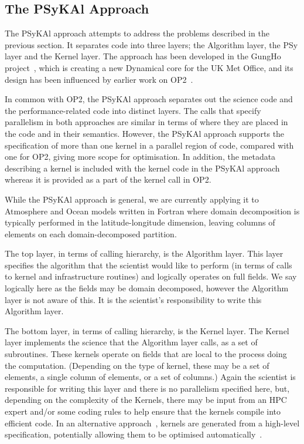 \documentclass[gmdd, manuscript]{copernicus}
\begin{document}
\subsection{The {PS}y{KA}l Approach}

The {PS}y{KA}l approach attempts to address the problems described in
the previous section. It separates code into three layers; the
Algorithm layer, the PSy layer and the Kernel layer. The approach has
been developed in the GungHo project~\citep{GungHo}, which is creating
a new Dynamical core for the UK Met Office, and its design has been
influenced by earlier work on OP2~\citep{OP2, PYOP2}.

In common with OP2, the {PS}y{KA}l approach separates out the science
code and the performance-related code into distinct layers. The calls
that specify parallelism in both approaches are similar in terms of
where they are placed in the code and in their semantics. However, the
{PS}y{KA}l approach supports the specification of more than one kernel
in a parallel region of code, compared with one for OP2, giving more
scope for optimisation. In addition, the metadata describing a kernel
is included with the kernel code in the {PS}y{KA}l approach whereas it
is provided as a part of the kernel call in OP2.

While the {PS}y{KA}l approach is general, we are currently applying it to
Atmosphere and Ocean models written in Fortran where domain
decomposition is typically performed in the latitude-longitude
dimension, leaving columns of elements on each domain-decomposed
partition.

The top layer, in terms of calling hierarchy, is the Algorithm
layer. This layer specifies the algorithm that the scientist would like
to perform (in terms of calls to kernel and infrastructure routines)
and logically operates on full fields. We say logically here as the
fields may be domain decomposed, however the Algorithm layer is not
aware of this. It is the scientist's responsibility to write this
Algorithm layer.

The bottom layer, in terms of calling hierarchy, is the Kernel
layer. The Kernel layer implements the science that the Algorithm
layer calls, as a set of subroutines. These kernels operate on fields
that are local to the process doing the computation. (Depending on the
type of kernel, these may be a set of elements, a single column of
elements, or a set of columns.) Again the scientist is responsible for
writing this layer and there is no parallelism specified here, but,
depending on the complexity of the Kernels, there may be input from an
HPC expert and/or some coding rules to help ensure that the kernels
compile into efficient code.  In an alternative
approach~\citep{firedrake,fenics}, kernels are generated from a
high-level specification, potentially allowing them to be optimised
automatically~\citep{coffee}.
\end{document}
